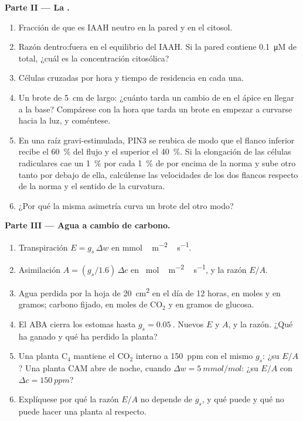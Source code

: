 \begin{problem}
\medskip
\noindent\textbf{Parte II --- La .}
\begin{enumerate}[resume]
  \item Fracción de  que es IAAH neutro en la pared y en el
        citosol.
  \item Razón dentro:fuera en el equilibrio del IAAH. Si la pared
        contiene \qty{0.1}{\micro M} de  total, ¿cuál es la
        concentración citosólica?
  \item Células cruzadas por hora y tiempo de residencia en cada una.
  \item Un brote de \qty{5}{cm} de largo: ¿cuánto tarda un cambio de
         en el ápice en llegar a la base? Compárese con la hora
        que tarda un brote en empezar a curvarse hacia la luz, y
        coméntese.
  \item En una raíz gravi-estimulada, PIN3 se reubica de modo que el
        flanco inferior recibe el \qty{60}{\%} del flujo y el superior
        el \qty{40}{\%}. Si la elongación de las células radiculares cae
        un \qty{1}{\%} por cada \qty{1}{\%} de  por encima de la
        norma y sube otro tanto por debajo de ella, calcúlense las
        velocidades de los dos flancos respecto de la norma y el sentido
        de la curvatura.
  \item ¿Por qué la misma asimetría curva un brote del otro modo?
\end{enumerate}

\medskip
\noindent\textbf{Parte III --- Agua a cambio de carbono.}
\begin{enumerate}[resume]
  \item Transpiración $E = g_{s}\,\Delta w$ en \unit{mmol\,m^{-2}\,s^{-1}}.
  \item Asimilación $A = (g_{s}/1.6)\,\Delta c$ en \unit{\micro
        mol\,m^{-2}\,s^{-1}}, y la razón $E/A$.
  \item Agua perdida por la hoja de \qty{20}{cm^2} en el día de 12
        horas, en moles y en gramos; carbono fijado, en moles de
        CO$_{2}$ y en gramos de glucosa.
  \item El ABA cierra los estomas hasta $g_{s} = \qty{0.05}{}$. Nuevos
        $E$ y $A$, y la razón. ¿Qué ha ganado y qué ha perdido la
        planta?
  \item Una planta C$_{4}$ mantiene el CO$_{2}$ interno a
        \qty{150}{ppm} con el mismo $g_{s}$: ¿su $E/A$? Una planta CAM
        abre de noche, cuando $\Delta w = \qty{5}{mmol/mol}$: ¿su $E/A$
        con $\Delta c =
        \qty{150}{ppm}$?
  \item Explíquese por qué la razón $E/A$ no depende de $g_{s}$, y qué
        puede y qué no puede hacer una planta al respecto.
\end{enumerate}


\end{problem}
